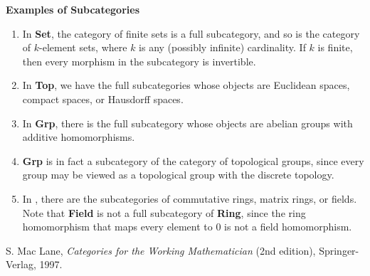\documentclass[12pt]{article}
\begin{document}
\textbf{Examples of Subcategories}
\begin{enumerate}
\item
In \textbf{Set}, the category of finite sets is a full subcategory, and so is the category of $k$-element sets, where $k$ is any (possibly infinite) cardinality.  If $k$ is finite, then every morphism in the subcategory is invertible.
\item
In \textbf{Top}, we have the full subcategories whose objects are Euclidean spaces, compact spaces, or Hausdorff spaces.
\item
In \textbf{Grp}, there is the full subcategory whose objects are abelian groups with additive homomorphisms.
\item
\textbf{Grp} is in fact a subcategory of the category of topological groups, since every group may be viewed as a topological group with the discrete topology.
\item
In , there are the subcategories of commutative rings, matrix rings, or fields.  Note that \textbf{Field} is not a full subcategory of \textbf{Ring}, since the ring homomorphism that maps every element to $0$ is not a field homomorphism.
\end{enumerate}

\begin{thebibliography}{9}
S. Mac Lane, \emph{Categories for the Working Mathematician} (2nd edition), Springer-Verlag, 1997.
\end{thebibliography}
\end{document}
